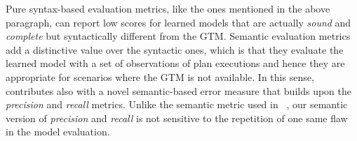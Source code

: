 Pure syntax-based evaluation metrics, like the ones mentioned in the above paragraph, can report low scores for learned models that are actually {\em sound} and {\em complete} but syntactically different from the GTM. Semantic evaluation metrics add a distinctive value over the syntactic ones, which is that they evaluate the learned model with a set of observations of plan executions and hence they are appropriate for scenarios where the GTM is not available. In this sense, \FAMA contributes also with a novel semantic-based error measure that builds upon the {\em precision} and {\em recall} metrics. Unlike the semantic metric used in \ARMS~\cite{yang2007learning}, our semantic version of {\em precision} and {\em recall} is not sensitive to the repetition of one same flaw in the model evaluation.





